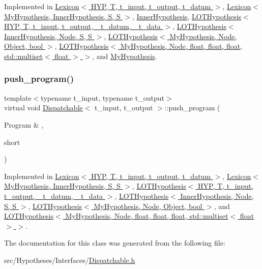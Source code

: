 Implemented in \hyperlink{class_lexicon_a4aad4c15b3193acf498e24a206533e86}{Lexicon$<$ H\+Y\+P, T, t\+\_\+input, t\+\_\+output, t\+\_\+datum $>$}, \hyperlink{class_lexicon_a4aad4c15b3193acf498e24a206533e86}{Lexicon$<$ My\+Hypothesis, Inner\+Hypothesis, S, S $>$}, \hyperlink{class_inner_hypothesis_a73c38e91c7c1bf021cbc8f9e5a758d13}{Inner\+Hypothesis}, \hyperlink{class_l_o_t_hypothesis_a9aade3ee6939a58e5d5b53505cfb2e7a}{L\+O\+T\+Hypothesis$<$ H\+Y\+P, T, t\+\_\+input, t\+\_\+output, \+\_\+t\+\_\+datum, \+\_\+t\+\_\+data $>$}, \hyperlink{class_l_o_t_hypothesis_a9aade3ee6939a58e5d5b53505cfb2e7a}{L\+O\+T\+Hypothesis$<$ Inner\+Hypothesis, Node, S, S $>$}, \hyperlink{class_l_o_t_hypothesis_a9aade3ee6939a58e5d5b53505cfb2e7a}{L\+O\+T\+Hypothesis$<$ My\+Hypothesis, Node, Object, bool $>$}, \hyperlink{class_l_o_t_hypothesis_a9aade3ee6939a58e5d5b53505cfb2e7a}{L\+O\+T\+Hypothesis$<$ My\+Hypothesis, Node, float, float, float, std\+::multiset$<$ float $>$ $>$}, and \hyperlink{class_my_hypothesis_a3de47a545e8824bb8c63181965c62a01}{My\+Hypothesis}.

\mbox{\label{class_dispatchable_a9339c2906f7c8dadbe1d0ca79dd9bb11}} 
\subsubsection{\texorpdfstring{push\+\_\+program()}{push\_program()}}
{\footnotesize\ttfamily template$<$typename t\+\_\+input, typename t\+\_\+output$>$ \\
virtual void \hyperlink{class_dispatchable}{Dispatchable}$<$ t\+\_\+input, t\+\_\+output $>$\+::push\+\_\+program (\begin{DoxyParamCaption}\item[{Program \&}]{,  }\item[{short}]{ }\end{DoxyParamCaption})\hspace{0.3cm}{\ttfamily [pure virtual]}}



Implemented in \hyperlink{class_lexicon_a4473f60c7ebdded00ac5cc9b00a2f4f6}{Lexicon$<$ H\+Y\+P, T, t\+\_\+input, t\+\_\+output, t\+\_\+datum $>$}, \hyperlink{class_lexicon_a4473f60c7ebdded00ac5cc9b00a2f4f6}{Lexicon$<$ My\+Hypothesis, Inner\+Hypothesis, S, S $>$}, \hyperlink{class_l_o_t_hypothesis_aff3a378ab1137e2b46f225a028343a1c}{L\+O\+T\+Hypothesis$<$ H\+Y\+P, T, t\+\_\+input, t\+\_\+output, \+\_\+t\+\_\+datum, \+\_\+t\+\_\+data $>$}, \hyperlink{class_l_o_t_hypothesis_aff3a378ab1137e2b46f225a028343a1c}{L\+O\+T\+Hypothesis$<$ Inner\+Hypothesis, Node, S, S $>$}, \hyperlink{class_l_o_t_hypothesis_aff3a378ab1137e2b46f225a028343a1c}{L\+O\+T\+Hypothesis$<$ My\+Hypothesis, Node, Object, bool $>$}, and \hyperlink{class_l_o_t_hypothesis_aff3a378ab1137e2b46f225a028343a1c}{L\+O\+T\+Hypothesis$<$ My\+Hypothesis, Node, float, float, float, std\+::multiset$<$ float $>$ $>$}.



The documentation for this class was generated from the following file\+:\begin{DoxyCompactItemize}
\item 
src/\+Hypotheses/\+Interfaces/\hyperlink{_dispatchable_8h}{Dispatchable.\+h}\end{DoxyCompactItemize}
